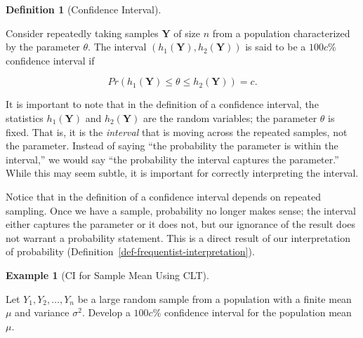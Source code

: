 \documentclass[
  letterpaper,
  DIV=11,
  numbers=noendperiod]{scrreprt}
\theoremstyle{definition}
\newtheorem{definition}{Definition}[chapter]
\theoremstyle{plain}
\theoremstyle{definition}
\newtheorem{example}{Example}[chapter]
\theoremstyle{remark}
\begin{document}
\begin{definition}[Confidence
Interval]\protect\hypertarget{def-confidence-interval}{}\label{def-confidence-interval}

Consider repeatedly taking samples \(\mathbf{Y}\) of size \(n\) from a
population characterized by the parameter \(\theta\). The interval
\(\left(h_1(\mathbf{Y}), h_2(\mathbf{Y})\right)\) is said to be a
\(100c\)\% confidence interval if

\[Pr\left(h_1(\mathbf{Y}) \leq \theta \leq h_2(\mathbf{Y})\right) = c.\]

\end{definition}

\begin{tcolorbox}[enhanced jigsaw, breakable, colframe=quarto-callout-warning-color-frame, titlerule=0mm, arc=.35mm, coltitle=black, opacitybacktitle=0.6, leftrule=.75mm, opacityback=0, left=2mm, toprule=.15mm, colbacktitle=quarto-callout-warning-color!10!white, title=\textcolor{quarto-callout-warning-color}{\faExclamationTriangle}\hspace{0.5em}{Warning}, bottomtitle=1mm, toptitle=1mm, rightrule=.15mm, bottomrule=.15mm, colback=white]

It is important to note that in the definition of a confidence interval,
the statistics \(h_1(\mathbf{Y})\) and \(h_2(\mathbf{Y})\) are the
random variables; the parameter \(\theta\) is fixed. That is, it is the
\emph{interval} that is moving across the repeated samples, not the
parameter. Instead of saying ``the probability the parameter is within
the interval,'' we would say ``the probability the interval captures the
parameter.'' While this may seem subtle, it is important for correctly
interpreting the interval.

\end{tcolorbox}

Notice that in the definition of a confidence interval depends on
repeated sampling. Once we have a sample, probability no longer makes
sense; the interval either captures the parameter or it does not, but
our ignorance of the result does not warrant a probability statement.
This is a direct result of our interpretation of probability
(Definition~\ref{def-frequentist-interpretation}).

\begin{example}[CI for Sample Mean Using
CLT]\protect\hypertarget{exm-ci-clt}{}\label{exm-ci-clt}

Let \(Y_1, Y_2, \dotsc, Y_n\) be a large random sample from a population
with a finite mean \(\mu\) and variance \(\sigma^2\). Develop a
\(100c\)\% confidence interval for the population mean \(\mu\).

\end{example}
\end{document}
